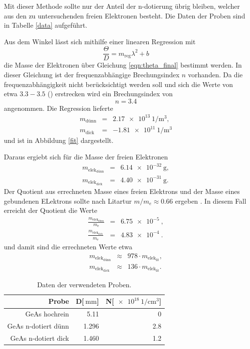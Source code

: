 Mit dieser Methode sollte nur der Anteil der n-dotierung übrig bleiben, welcher aus den zu untersuchenden freien Elektronen besteht.
Die Daten der Proben sind in Tabelle \ref{data} aufgeführt.

Aus dem Winkel lässt sich mithilfe einer linearen Regression mit
\begin{equation*}
	\frac{\Theta}{D} = m_\text{reg} \lambda^2 + b
\end{equation*}
die Masse der Elektronen über Gleichung \eqref{eqn:theta_final} bestimmt werden.
In dieser Gleichung ist der frequenzabhängige Brechungsindex $n$ vorhanden. Da die frequenzabhängigkeit nicht berücksichtigt werden soll und sich die Werte von etwa $3.3-3.5$ (\cite{GeAs}) erstrecken wird ein Brechungsindex von 
\begin{equation*}
	n = 3.4
\end{equation*}
angenommen.
Die Regression lieferte 
\begin{eqnarray*}
	m_\text{dünn} &=& \SI{2.17e13}{1\per\meter^3},\\
	m_\text{dick} &=& \SI{-1.81e11}{1\per\meter^3}
\end{eqnarray*}
und ist in Abbildung \ref{fit} dargestellt.

Daraus ergiebt sich für die Masse der freien Elektronen
\begin{eqnarray*}
	m_{\text{elek}_\text{dünn}} &=& \SI{6.14e-32}{\gram},\\
	m_{\text{elek}_\text{dick}} &=& \SI{4.40e-31}{\gram}.
\end{eqnarray*}
Der Quotient aus errechneten Masse eines freien Elektrons und der Masse eines gebundenen ELektrons sollte nach Litartur $m/m_e \approx 0.66$ ergeben \cite{kittel}.
In diesem Fall erreicht der Quotient die Werte
\begin{eqnarray*}
	\frac{m_{\text{elek}_\text{dünn}}}{m_\text{e}} &=& \SI{6.75e-5}{},\\
	\frac{m_{\text{elek}_\text{dick}}}{m_\text{e}} &=& \SI{4.83e-4}{}.
\end{eqnarray*}
und damit sind die errechneten Werte etwa
\begin{eqnarray*}
	m_{\text{elek}_\text{dünn}} &\approx& 	978 \cdot m_{\text{elek}_\text{lit}},\\
	m_{\text{elek}_\text{dick}} &\approx& 	136 \cdot m_{\text{elek}_\text{lit}}.
\end{eqnarray*}

\begin{table}
	\centering
	\caption{Daten der verwendeten Proben.}
	\begin{tabular}{r r r}
		Probe & D[$\SI{}{\milli\meter}$]& N[$\SI{e18}{1\per\centi\meter^3}$]\\ 
		\hline	\hline
		GeAs hochrein & 5.11 & 0\\
		GeAs n-dotiert dünn & 1.296 & 2.8\\
		GeAs n-dotiert dick & 1.460 & 1.2\\
	\end{tabular}
\end{table}

